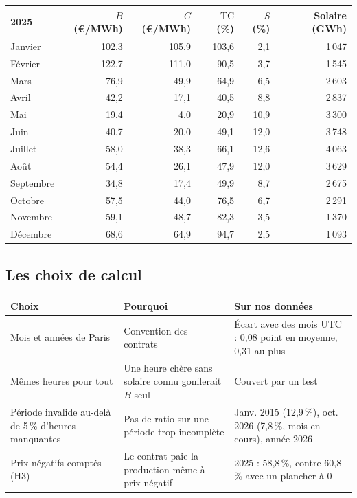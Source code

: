 \documentclass[11pt,a4paper]{article}
\newcommand{\TC}{\mathrm{TC}}
\begin{document}
\begin{center}
\small
\begin{tabular}{lrrrrr}
\toprule
\textbf{2025} & $B$ (€/MWh) & $C$ (€/MWh) & $\TC$ (\%) & $S$ (\%) & Solaire (GWh) \\
\midrule
Janvier & 102,3 & 105,9 & 103,6 & 2,1 & 1\,047 \\
Février & 122,7 & 111,0 & 90,5 & 3,7 & 1\,545 \\
Mars & 76,9 & 49,9 & 64,9 & 6,5 & 2\,603 \\
Avril & 42,2 & 17,1 & 40,5 & 8,8 & 2\,837 \\
Mai & 19,4 & 4,0 & 20,9 & 10,9 & 3\,300 \\
Juin & 40,7 & 20,0 & 49,1 & 12,0 & 3\,748 \\
Juillet & 58,0 & 38,3 & 66,1 & 12,6 & 4\,063 \\
Août & 54,4 & 26,1 & 47,9 & 12,0 & 3\,629 \\
Septembre & 34,8 & 17,4 & 49,9 & 8,7 & 2\,675 \\
Octobre & 57,5 & 44,0 & 76,5 & 6,7 & 2\,291 \\
Novembre & 59,1 & 48,7 & 82,3 & 3,5 & 1\,370 \\
Décembre & 68,6 & 64,9 & 94,7 & 2,5 & 1\,093 \\
\bottomrule
\end{tabular}
\end{center}

\subsection{Les choix de calcul}

\begin{center}
\begin{tabularx}{\linewidth}{YYY}
\toprule
\textbf{Choix} & \textbf{Pourquoi} & \textbf{Sur nos données} \\
\midrule
Mois et années de Paris & Convention des contrats & Écart avec des mois UTC : 0,08 point en moyenne, 0,31 au plus \\
Mêmes heures pour tout & Une heure chère sans solaire connu gonflerait $B$ seul & Couvert par un test \\
Période invalide au-delà de 5\,\% d'heures manquantes & Pas de ratio sur une période trop incomplète & Janv. 2015 (12,9\,\%), oct. 2026 (7,8\,\%, mois en cours), année 2026 \\
Prix négatifs comptés (H3) & Le contrat paie la production même à prix négatif & 2025 : 58,8\,\%, contre 60,8\,\% avec un plancher à 0 \\
\bottomrule
\end{tabularx}
\end{center}
\end{document}
